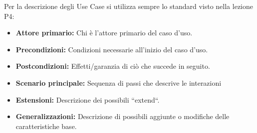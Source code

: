 \noindent Per la descrizione degli Use Case si utilizza sempre lo standard visto nella lezione P4:
\begin{itemize}
	\item \textbf{Attore primario:} Chi è l'attore primario del caso d'uso.
	\item \textbf{Precondizioni:} Condizioni necessarie all'inizio del caso d'uso.
	\item \textbf{Postcondizioni:} Effetti/garanzia di ciò che succede in seguito.
	\item \textbf{Scenario principale:} Sequenza di passi che descrive le interazioni
	\item \textbf{Estensioni:} Descrizione dei possibili ``extend``.
	\item \textbf{Generalizzazioni:} Descrizione di possibili aggiunte o modifiche delle caratteristiche base.
\end{itemize}


